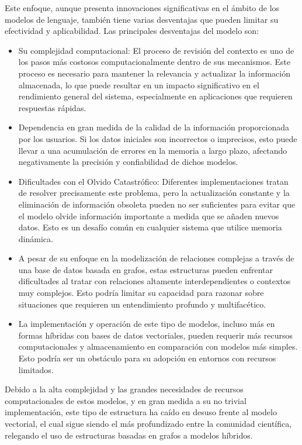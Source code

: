 \documentclass{article}
\begin{document}
Este enfoque, aunque presenta innovaciones significativas en el ámbito de los modelos de lenguaje, también tiene varias desventajas que pueden limitar su efectividad y aplicabilidad. Las principales desventajas del modelo son:
\begin{itemize}
    \item Su complejidad computacional: El proceso de revisión del contexto es uno de los pasos más costosos computacionalmente dentro de sus mecanismos. Este proceso es necesario para mantener la relevancia y actualizar la información almacenada, lo que puede resultar en un impacto significativo en el rendimiento general del sistema, especialmente en aplicaciones que requieren respuestas rápidas.
    \item Dependencia en gran medida de la calidad de la información proporcionada por los usuarios. Si los datos iniciales son incorrectos o imprecisos, esto puede llevar a una acumulación de errores en la memoria a largo plazo, afectando negativamente la precisión y confiabilidad de dichos modelos.
    \item Dificultades con el Olvido Catastrófico: Diferentes implementaciones tratan de resolver precisamente este problema, pero la actualización constante y la eliminación de información obsoleta pueden no ser suficientes para evitar que el modelo olvide información importante a medida que se añaden nuevos datos. Esto es un desafío común en cualquier sistema que utilice memoria dinámica.
    \item A pesar de su enfoque en la modelización de relaciones complejas a través de una base de datos basada en grafos, estas estructuras pueden enfrentar dificultades al tratar con relaciones altamente interdependientes o contextos muy complejos. Esto podría limitar su capacidad para razonar sobre situaciones que requieren un entendimiento profundo y multifacético.
    \item La implementación y operación de este tipo de modelos, incluso más en formas híbridas con bases de datos vectoriales, pueden requerir más recursos computacionales y almacenamiento en comparación con modelos más simples. Esto podría ser un obstáculo para su adopción en entornos con recursos limitados.
\end{itemize}

Debido a la alta complejidad y las grandes necesidades de recursos computacionales de estos modelos, y en gran medida a su no trivial implementación, este tipo de estructura ha caído en desuso frente al modelo vectorial, el cual sigue siendo el más profundizado entre la comunidad científica, relegando el uso de estructuras basadas en grafos a modelos híbridos.
\end{document}
